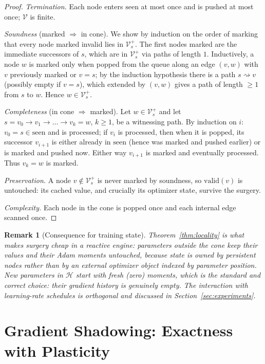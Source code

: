 \documentclass[11pt,a4paper]{article}
\newtheorem{remark}{Remark}
\newcommand{\Hb}{\mathcal{H}}
\newcommand{\V}{\mathcal{V}}
\begin{document}
\begin{proof}
\emph{Termination.} Each node enters $\mathrm{seen}$ at most once and is pushed at most once; $\V$ is finite.

\emph{Soundness} (marked $\Rightarrow$ in cone). We show by induction on the order of marking that every node marked invalid lies in $\V_s^{+}$. The first nodes marked are the immediate successors of $s$, which are in $\V_s^{+}$ via paths of length $1$. Inductively, a node $w$ is marked only when popped from the queue along an edge $(v, w)$ with $v$ previously marked or $v = s$; by the induction hypothesis there is a path $s \rightsquigarrow v$ (possibly empty if $v = s$), which extended by $(v,w)$ gives a path of length $\geq 1$ from $s$ to $w$. Hence $w \in \V_s^{+}$.

\emph{Completeness} (in cone $\Rightarrow$ marked). Let $w \in \V_s^{+}$ and let $s = v_0 \to v_1 \to \dots \to v_k = w$, $k \geq 1$, be a witnessing path. By induction on $i$: $v_0 = s \in \mathrm{seen}$ and is processed; if $v_i$ is processed, then when it is popped, its successor $v_{i+1}$ is either already in $\mathrm{seen}$ (hence was marked and pushed earlier) or is marked and pushed now. Either way $v_{i+1}$ is marked and eventually processed. Thus $v_k = w$ is marked.

\emph{Preservation.} A node $v \notin \V_s^{+}$ is never marked by soundness, so $\mathrm{valid}(v)$ is untouched: its cached value, and crucially its optimizer state, survive the surgery.

\emph{Complexity.} Each node in the cone is popped once and each internal edge scanned once.
\end{proof}

\begin{remark}[Consequence for training state]
Theorem~\ref{thm:locality} is what makes surgery cheap in a reactive engine: parameters outside the cone keep their values \emph{and} their Adam moments untouched, because state is owned by persistent nodes rather than by an external optimizer object indexed by parameter position. New parameters in $\Hb$ start with fresh (zero) moments, which is the standard and correct choice: their gradient history is genuinely empty. The interaction with learning-rate schedules is orthogonal and discussed in Section~\ref{sec:experiments}.
\end{remark}

\section{Gradient Shadowing: Exactness with Plasticity}
\label{sec:shadow}
\end{document}
